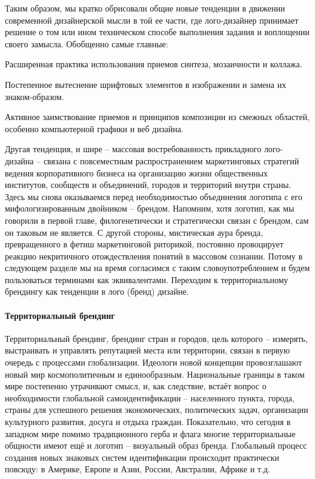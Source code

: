 Таким образом, мы кратко обрисовали общие новые тенденции в движении современной дизайнерской мысли
в той ее части, где лого-дизайнер принимает решение о том или ином техническом способе выполнения
задания и воплощении своего замысла. Обобщенно самые главные:
\begin{enumerate*}[label=\arabic*)]
\item Расширенная практика использования приемов синтеза, мозаичности и коллажа.
\item Постепенное вытеснение шрифтовых элементов в изображении и замена их знаком-образом.
\item Активное заимствование приемов и принципов композиции из смежных областей, особенно компьютерной графики и веб дизайна.
\end{enumerate*}

Другая тенденция, и шире -- массовая  востребованность  прикладного лого-дизайна -- связана с
повсеместным распространением  маркетинговых стратегий ведения корпоративного бизнеса на организацию
жизни общественных институтов, сообществ и объединений, городов и территорий внутри страны. Здесь мы
снова оказываемся перед необходимостью объединения логотипа с его мифологизированным двойником --
брендом. Напомним, хотя логотип, как мы говорили в первой главе, филогенетически и стратегически
связан с брендом, сам он таковым не является. С другой стороны, мистическая аура бренда,
превращенного в фетиш маркетинговой риторикой, постоянно провоцирует реакцию некритичного
отождествления понятий в массовом сознании. Потому в следующем разделе мы на время согласимся с
таким словоупотреблением и будем пользоваться терминами как эквивалентами. Переходим к
территориальному брендингу как тенденции в лого (бренд) дизайне.

\paragraph{Территориальный брендинг}

Территориальный брендинг, брендинг стран и городов, цель которого -- измерять, выстраивать и
управлять репутацией места или территории, связан в первую очередь с процессами
глобализации. Идеологи новой концепции провозглашают  новый мир  космополитичным и единообразным.
Национальные границы в таком мире постепенно утрачивают смысл, и, как следствие, встаёт вопрос о
необходимости глобальной самоидентификации --  населенного пункта, города, страны  для успешного
решения экономических, политических задач, организации культурного развития, досуга и отдыха
граждан. Показательно, что сегодня в западном мире помимо традиционного герба и флага многие
территориальные общности имеют ещё и логотип -- визуальный образ бренда. Глобальный процесс создания
новых знаковых систем идентификации происходит практически повсюду: в Америке, Европе и Азии,
России, Австралии, Африке и т.д.

